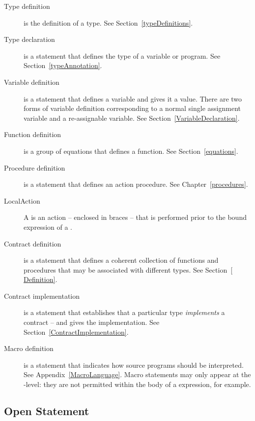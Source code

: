 \begin{description}
\item[Type definition] is the definition of a type. See Section~\vref{typeDefinitions}.
\item[Type declaration] is a statement that defines the type of a variable or program. See Section~\vref{typeAnnotation}.
\item[Variable definition] is a statement that defines a variable and gives it a value. There are two forms of variable definition corresponding to a normal single assignment variable and a re-assignable variable. See Section~\vref{VariableDeclaration}.
\item[Function definition] 
is a group of equations that defines a function. See Section~\vref{equations}.
\item[Procedure definition]
 is a statement that defines an action procedure. See Chapter~\vref{procedures}.
\item[LocalAction]
A  is an action -- enclosed in braces -- that is performed prior to the bound expression of a .

\item[Contract definition] 
is a statement that defines a coherent collection of functions and procedures that may be associated with different types. See Section~\vref{		Definition}.
\item[Contract implementation] 
is a statement that establishes that a particular type \emph{implements} a contract -- and gives the implementation. See Section~\vref{ContractImplementation}.
\item[Macro definition]
is a statement that indicates how source programs should be interpreted. See Appendix~\vref{MacroLanguage}. Macro statements may only appear at the -level: they are not permitted within the body of a  expression, for example.
\end{description}

\subsection{Open Statement}
\label{openStatement}

